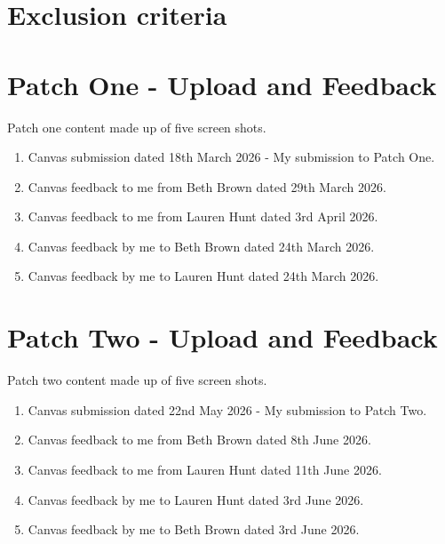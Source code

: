 \documentclass[12pt,a4paper,oneside]{report}
\begin{document}
\chapter{Exclusion criteria}
\label{app:exclusion-criteria}


\chapter{Patch One - Upload and Feedback}
\label{app:patch-one-upload-and-feedback}
Patch one content made up of five screen shots.
\begin{enumerate}
    \item Canvas submission dated 18th March 2026 - My submission to Patch One.
    \item Canvas feedback to me from Beth Brown dated 29th March 2026.
    \item Canvas feedback to me from Lauren Hunt dated 3rd April 2026.
    \item Canvas feedback by me to Beth Brown dated 24th March 2026.
    \item Canvas feedback by me to Lauren Hunt dated 24th March 2026.
\end{enumerate}


\chapter{Patch Two - Upload and Feedback}
\label{app:patch-two-upload-and-feedback}
Patch two content made up of five screen shots.
\begin{enumerate}
    \item Canvas submission dated 22nd May 2026 - My submission to Patch Two.
    \item Canvas feedback to me from Beth Brown dated 8th June 2026.
    \item Canvas feedback to me from Lauren Hunt dated 11th June 2026.
    \item Canvas feedback by me to Lauren Hunt dated 3rd June 2026.
    \item Canvas feedback by me to Beth Brown dated 3rd June 2026.
\end{enumerate}

\clearpage
\end{document}
